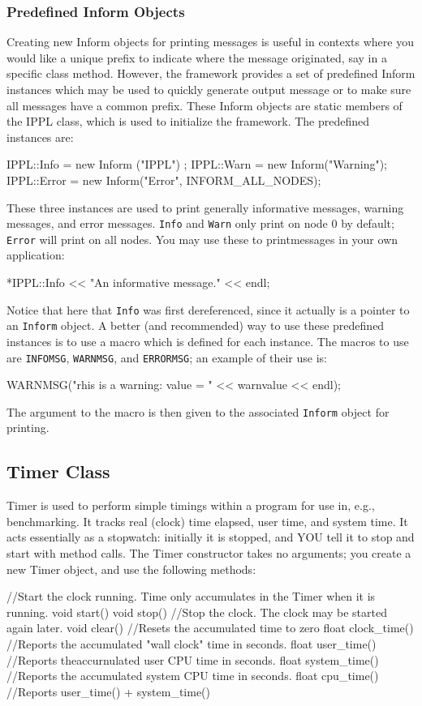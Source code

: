 \subsubsection{Predefined Inform Objects}
Creating new Inform objects for printing messages is useful in contexts where you would like a unique prefix to indicate where the message originated, say in a specific class method. However, the \ippl framework provides a set of predefined Inform instances which may be used to quickly generate output message or to make sure all messages have a common prefix. These Inform objects are static members of the IPPL class, which is used to initialize the framework. The predefined instances are:
\begin{smallcode}
IPPL::Info = new Inform ("IPPL") ;
IPPL::Warn = new Inform("Warning");
IPPL::Error = new Inform("Error", INFORM_ALL_NODES);
\end{smallcode}
These three instances are used to print generally informative messages, warning messages, and error messages. \texttt{Info} and \texttt{Warn} only print on node 0 by default; \texttt{Error} will print on all nodes. You may use these to printmessages in your own application:
\begin{smallcode}
*IPPL::Info << "An informative message." << endl;
\end{smallcode}
Notice that here that \texttt{Info} was first dereferenced, since it actually is a pointer to an \texttt{Inform} object. A better (and recommended) way to use these predefined instances is to use a macro which is defined for each instance. The macros to use are \texttt{INFOMSG}, \texttt{WARNMSG}, and \texttt{ERRORMSG}; an example of their use is:
\begin{smallcode}
WARNMSG("rhis is a warning: value = " << warnvalue << endl);
\end{smallcode}
The argument to the macro is then given to the associated \texttt{Inform} object for printing.

\subsection{Timer Class}
Timer is used to perform simple timings within a program for use in, e.g., benchmarking. It tracks real (clock) time elapsed, user time, and system time. It acts essentially as a stopwatch:
initially it is stopped, and YOU tell it to stop and start with method calls. The Timer constructor takes no arguments; you create a new Timer object, and use the following methods:
\begin{smallcode}
//Start the clock running. Time only accumulates in the Timer when it is running.
void start()
void stop()         //Stop the clock. The clock may be started again later.
void clear()        //Resets the accumulated time to zero
float clock_time()  //Reports the accumulated "wall clock" time in seconds.
float user_time()   //Reports theaccurnulated user CPU time in seconds.
float system_time() //Reports the accumulated system CPU time in seconds.
float cpu_time()    //Reports user_time() + system_time()
\end{smallcode}

